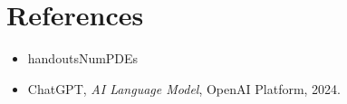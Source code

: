 \documentclass[a4paper]{article}
\begin{document}
\section{References}
\begin{itemize}
   \item handoutsNumPDEs
   \item ChatGPT, \textit{AI Language Model}, OpenAI Platform, 2024.
\end{itemize}
\end{document}
